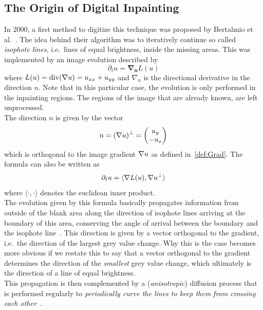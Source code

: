 \subsection{The Origin of Digital Inpainting}
In 2000, a first method to digitize this technique was proposed by Bertalmio et al.~\cite{bertalmio00}.
The idea behind their algorithm was to iteratively continue so called \textit{isophote
lines}, i.e.\ lines of equal brightness, inside the missing areas. 
This was implemented by an image evolution described by 
\begin{equation}
    \partial_t u = \mathbf{\nabla_n} L(u)  
\end{equation}
where $L(u) = \operatorname{div}(\mathbf{\nabla}  u) = u_{xx} + u_{yy}$ and $\nabla_n$ is the 
directional derivative in the direction $n$. Note that in this particular case, the evolution is
only performed in the inpainting regions. The regions of the image that are already known, are left
unprocessed. \\
The direction $n$ is given by the vector
\begin{equation}
    n = {(\mathbf{\nabla}  u)}^\bot = \begin{pmatrix}
        u_y\\-u_x
    \end{pmatrix}
\end{equation}
which is orthogonal to the image gradient $\mathbf{\nabla} u$ as defined in~\ref{def:Grad}.
The formula can also be written as 
\begin{equation}
    \partial_t u = \langle \mathbf{\nabla} L(u), \mathbf{\nabla} u^\bot\rangle
\end{equation}
where $\langle\cdot,\cdot\rangle$ denotes the euclidean inner product.\\
The evolution given by this formula basically propagates information from outside of the blank
area along the direction of isophote lines arriving at the boundary of this area, conserving the
angle of arrival between the boundary and the isophote line~\cite{bertalmio00}.
This direction is given by a vector orthogonal to the gradient, i.e.\ the direction of the largest
grey value change.
Why this is the case becomes more obvious if we restate this to say that a vector orthogonal to the gradient
determines the direction of the \textit{smallest} grey value change, which ultimately is the
direction of a line of equal brightness.\\
This propagation is then complemented by a (\textit{anisotropic}) diffusion process that is performed regularly to
\textit{periodically curve the lines to keep them from crossing each other}~\cite{bertalmio00}.
